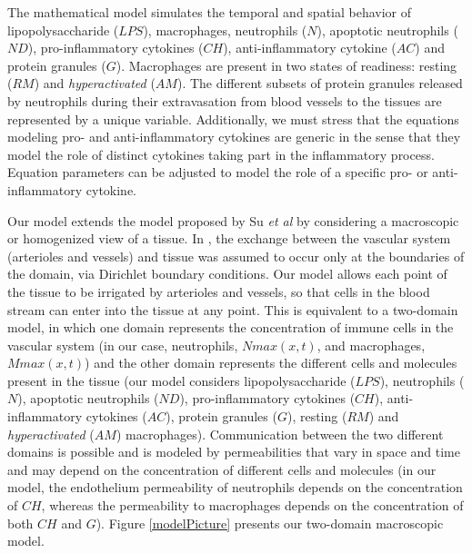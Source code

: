 \documentclass[10pt]{bmc_article}
\newenvironment{bmcformat}{\baselineskip20pt\sloppy\setboolean{publ}{false}}{\baselineskip20pt\sloppy}
\begin{document}
\begin{bmcformat}
The mathematical model simulates the temporal and spatial behavior of lipopolysaccharide ($LPS$), macrophages, neutrophils ($N$), 
apoptotic neutrophils ($ND$), pro-inflammatory cytokines ($CH$), anti-inflammatory cytokine ($AC$) and protein granules ($G$). 
Macrophages are present in two states of readiness: resting ($RM$) and \textit{hyperactivated} ($AM$). The different subsets of 
protein granules \cite{Niels1997} released by neutrophils during their extravasation from blood vessels to the tissues are represented 
by a unique variable. Additionally, we must stress that the equations modeling pro- and anti-inflammatory cytokines are generic in 
the sense that they model the role of distinct cytokines taking part in the inflammatory process. Equation parameters can be adjusted 
to model the role of a specific pro- or anti-inflammatory cytokine. 

Our model extends the model proposed by Su \textit{et al} \cite{localmodel} by considering a macroscopic or homogenized view of a 
tissue. In \cite{localmodel}, the exchange between the vascular system (arterioles and vessels) and tissue was assumed to occur 
only at the boundaries of the domain, via Dirichlet boundary conditions. Our model allows each point of the tissue to be irrigated 
by arterioles and vessels, so that cells in the blood stream can enter into the tissue at any point. This is equivalent to a 
two-domain model, in which one domain represents the concentration of immune cells in the vascular system (in our case, neutrophils, 
$Nmax(x,t)$, and macrophages, $Mmax(x,t)$) and the other domain represents the different cells and molecules present in the tissue 
(our model considers lipopolysaccharide ($LPS$), neutrophils ($N$), apoptotic neutrophils ($ND$), pro-inflammatory cytokines ($CH$), 
anti-inflammatory cytokines ($AC$), protein granules ($G$), resting ($RM$) and \textit{hyperactivated} ($AM$) macrophages).
Communication between the two different domains is possible and is modeled by permeabilities that vary in space and time and may 
depend on the concentration of different cells and molecules (in our model, the endothelium permeability of neutrophils depends on 
the concentration of $CH$, whereas the permeability to macrophages depends on the concentration of both $CH$ and $G$). Figure 
\ref{modelPicture} presents our two-domain macroscopic model.



\end{bmcformat}
\end{document}

